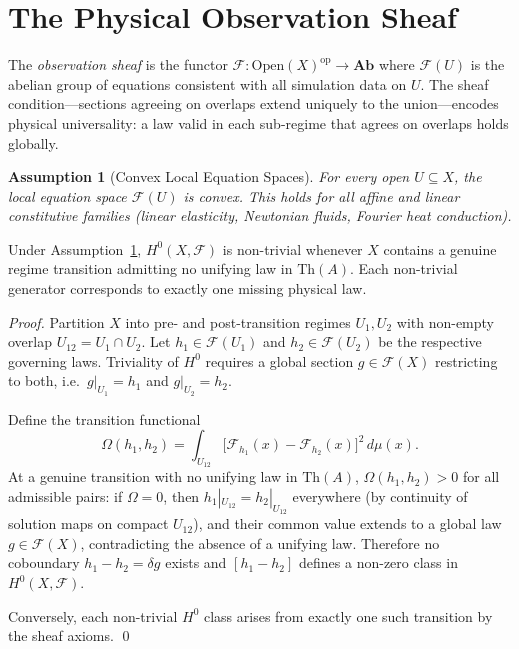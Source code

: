 \documentclass[twoside,11pt]{article}
\newcommand{\FA}{\mathcal{F}}
\newcommand{\Th}{\mathrm{Th}}
\newtheorem{assumption}[theorem]{Assumption}
\begin{document}
\section{The Physical Observation Sheaf}
\label{sec:sheaf}

\noindent
The \emph{observation sheaf} is the functor
$\FA : \mathrm{Open}(X)^{\mathrm{op}} \to \mathbf{Ab}$
where $\FA(U)$ is the abelian group of equations consistent with
all simulation data on $U$. The sheaf condition---sections agreeing on
overlaps extend uniquely to the union---encodes physical universality:
a law valid in each sub-regime that agrees on overlaps holds globally.

\begin{assumption}[Convex Local Equation Spaces]
\label{ass:convex}
For every open $U \subseteq X$, the local equation space $\FA(U)$
is convex. This holds for all affine and linear constitutive families
(linear elasticity, Newtonian fluids, Fourier heat conduction).
\end{assumption}

\begin{theorem}
\label{thm:cohomology}
Under Assumption~\ref{ass:convex}, $H^0(X,\FA)$ is non-trivial
whenever $X$ contains a genuine regime transition admitting no
unifying law in $\Th(A)$. Each non-trivial generator corresponds to
exactly one missing physical law.
\end{theorem}

\begin{proof}
Partition $X$ into pre- and post-transition regimes $U_1, U_2$ with
non-empty overlap $U_{12} = U_1 \cap U_2$. Let $h_1 \in \FA(U_1)$
and $h_2 \in \FA(U_2)$ be the respective governing laws. Triviality
of $H^0$ requires a global section $g \in \FA(X)$ restricting to
both, i.e.\ $g|_{U_1} = h_1$ and $g|_{U_2} = h_2$.

Define the transition functional
\begin{equation}
  \Omega(h_1, h_2)
  = \int_{U_{12}} \bigl[\FA_{h_1}(x) - \FA_{h_2}(x)\bigr]^2\,
    d\mu(x).
  \label{eq:omega}
\end{equation}
At a genuine transition with no unifying law in $\Th(A)$,
$\Omega(h_1,h_2) > 0$ for all admissible pairs: if
$\Omega = 0$, then $h_1|_{U_{12}} = h_2|_{U_{12}}$ everywhere
(by continuity of solution maps on compact $U_{12}$), and their
common value extends to a global law $g \in \FA(X)$, contradicting
the absence of a unifying law. Therefore no coboundary
$h_1 - h_2 = \delta g$ exists and $[h_1 - h_2]$ defines a non-zero
class in $H^0(X,\FA)$.

Conversely, each non-trivial $H^0$ class arises from exactly one
such transition by the sheaf axioms. \qed
\end{proof}
\end{document}

